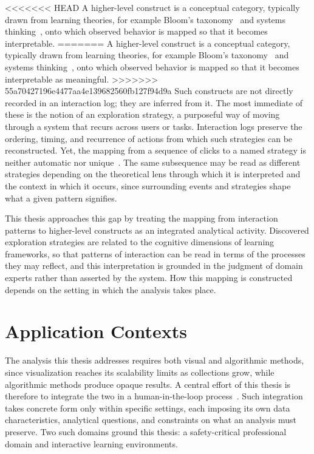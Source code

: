 <<<<<<< HEAD
A higher-level construct is a conceptual category, typically drawn from learning theories, for example Bloom's taxonomy~\cite{bloom1956taxonomy, anderson2001taxonomy} and systems thinking~\cite{kim1999introduction, monat2015what}, onto which observed behavior is mapped so that it becomes interpretable.
=======
A higher-level construct is a conceptual category, typically drawn from learning theories, for example Bloom's taxonomy~\cite{bloom1956taxonomy, anderson2001taxonomy} and systems thinking~\cite{kim1999introduction, monat2015what}, onto which observed behavior is mapped so that it becomes interpretable as meaningful.
>>>>>>> 55a70427196e4477aa4e139682560fb127f94d9a
Such constructs are not directly recorded in an interaction log; they are inferred from it.
The most immediate of these is the notion of an exploration strategy, a purposeful way of moving through a system that recurs across users or tasks.
Interaction logs preserve the ordering, timing, and recurrence of actions from which such strategies can be reconstructed.
Yet, the mapping from a sequence of clicks to a named strategy is neither automatic nor unique~\cite{bogarin2018survey}.
The same subsequence may be read as different strategies depending on the theoretical lens through which it is interpreted and the context in which it occurs, since surrounding events and strategies shape what a given pattern signifies.

This thesis approaches this gap by treating the mapping from interaction patterns to higher-level constructs as an integrated analytical activity.
Discovered exploration strategies are related to the cognitive dimensions of learning frameworks, so that patterns of interaction can be read in terms of the processes they may reflect, and this interpretation is grounded in the judgment of domain experts rather than asserted by the system.
How this mapping is constructed depends on the setting in which the analysis takes place. 





\section{Application Contexts}

The analysis this thesis addresses requires both visual and algorithmic methods, since visualization reaches its scalability limits as collections grow, while algorithmic methods produce opaque results.
A central effort of this thesis is therefore to integrate the two in a human-in-the-loop process~\cite{keim2008visual, miksch2024visual}.
Such integration takes concrete form only within specific settings, each imposing its own data characteristics, analytical questions, and constraints on what an analysis must preserve.
Two such domains ground this thesis: a safety-critical professional domain and interactive learning environments.


